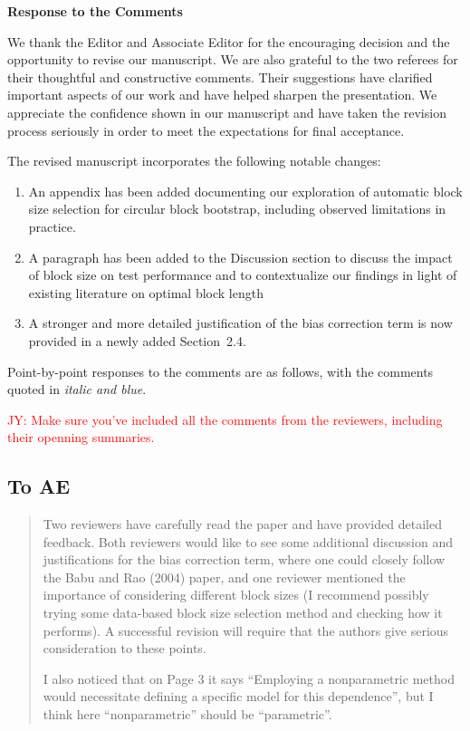 \documentclass[12pt]{article}
\newcommand{\jy}[1]{\textcolor{red}{JY: #1}}
\newenvironment{comment}%
{\begin{quotation}\noindent\small\it\color{darkblue}\ignorespaces%
}{\end{quotation}}
\begin{document}
\begin{center}
  {\Large\bf Response to the Comments}
\end{center}


We thank the Editor and Associate Editor for the encouraging decision
and the opportunity to revise our manuscript. We are also grateful to
the two referees for their thoughtful and constructive comments. Their
suggestions have clarified important aspects of our work and have
helped sharpen the presentation. We appreciate the confidence shown in
our manuscript and have taken the revision process seriously in order
to meet the expectations for final acceptance.


The revised manuscript incorporates the following notable changes:
\begin{enumerate}
\item An appendix has been added documenting our exploration of
  automatic block size selection for circular block bootstrap,
  including observed limitations in practice.
\item  A paragraph has been added to the Discussion section to
  discuss the impact of block size on test performance and to
  contextualize our findings in light of existing literature on
  optimal block length
\item A stronger and more detailed justification of the bias
  correction term is now provided in a newly added Section~2.4.
\end{enumerate}


Point-by-point responses to the comments are as follows, with the
comments quoted in \emph{\color{darkblue} italic and blue}.

\jy{Make sure you've included all the comments from the reviewers,
  including their openning summaries.}

\subsection*{To AE}

\begin{comment}
  
Two reviewers have carefully read the paper and have provided detailed feedback.  Both reviewers would like to see some additional discussion and justifications for the bias correction term, where one could closely follow the Babu and Rao (2004) paper, and one reviewer mentioned the importance of considering different block sizes (I recommend possibly trying some data-based block size selection method and checking how it performs).  A successful revision will require that the authors give serious consideration to these points.

I also noticed that on Page 3 it says “Employing a nonparametric method would necessitate defining a specific model for this dependence”, but I think here “nonparametric” should be “parametric”.
\end{comment}
\end{document}
